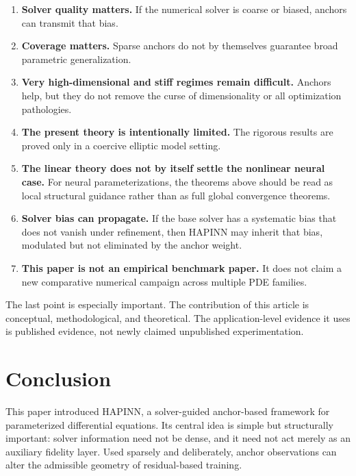 \documentclass[preprint,12pt]{elsarticle}
\theoremstyle{definition}
\numberwithin{equation}{section}
\begin{document}
\begin{enumerate}[label=\arabic*)]
    \item \textbf{Solver quality matters.} If the numerical solver is coarse or biased, anchors can transmit that bias.
    \item \textbf{Coverage matters.} Sparse anchors do not by themselves guarantee broad parametric generalization.
    \item \textbf{Very high-dimensional and stiff regimes remain difficult.} Anchors help, but they do not remove the curse of dimensionality or all optimization pathologies.
    \item \textbf{The present theory is intentionally limited.} The rigorous results are proved only in a coercive elliptic model setting.
    \item \textbf{The linear theory does not by itself settle the nonlinear neural case.} For neural parameterizations, the theorems above should be read as local structural guidance rather than as full global convergence theorems.
    \item \textbf{Solver bias can propagate.} If the base solver has a systematic bias that does not vanish under refinement, then HAPINN may inherit that bias, modulated but not eliminated by the anchor weight.
    \item \textbf{This paper is not an empirical benchmark paper.} It does not claim a new comparative numerical campaign across multiple PDE families.
\end{enumerate}

The last point is especially important. The contribution of this article is conceptual, methodological, and theoretical. The application-level evidence it uses is published evidence, not newly claimed unpublished experimentation.

\section{Conclusion}
\label{sec:conclusion}

This paper introduced HAPINN, a solver-guided anchor-based framework for parameterized differential equations. Its central idea is simple but structurally important: solver information need not be dense, and it need not act merely as an auxiliary fidelity layer. Used sparsely and deliberately, anchor observations can alter the admissible geometry of residual-based training.
\end{document}
